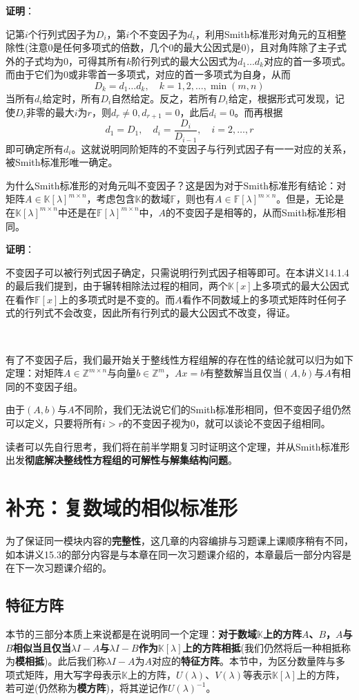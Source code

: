 \documentclass[a4paper,UTF8,fontset=windows,AutoFakeBold]{ctexart}
\newcommand*{\note}{\noindent *}
\newcommand{\proo}[1]{{\vspace{5pt}\kaishu\noindent\textbf{证明}：\vspace{-3pt}
\begin{compactitem}
    \item[] #1
\end{compactitem}
}}
\begin{document}
\proo{
    记第$i$个行列式因子为$D_i$，第$i$个不变因子为$d_i$，利用Smith标准形对角元的互相整除性(注意0是任何多项式的倍数，几个0的最大公因式是0)，且对角阵除了主子式外的子式均为0，可得其所有$k$阶行列式的最大公因式为$d_1\dots d_k$对应的首一多项式。而由于它们为0或非零首一多项式，对应的首一多项式为自身，从而
    $$D_k=d_1\dots d_k,\quad k=1,2,\dots,\min(m,n)$$
    当所有$d_i$给定时，所有$D_i$自然给定。反之，若所有$D_i$给定，根据形式可发现，记使$D_i$非零的最大$i$为$r$，则$d_r\ne 0,d_{r+1}=0$，此后$d_i=0$。而再根据
    $$d_1=D_1,\quad d_i=\frac{D_i}{D_{i-1}},\quad i=2,\dots,r$$
    即可确定所有$d_i$。这就说明同阶矩阵的不变因子与行列式因子有一一对应的关系，被Smith标准形唯一确定。
}

\note 为什么Smith标准形的对角元叫不变因子？这是因为对于Smith标准形有结论：对矩阵$A\in\mathbb{K}[\lambda]^{m\times n}$，考虑包含$\mathbb{K}$的数域$\mathbb{F}$，则也有$A\in\mathbb{F}[\lambda]^{m\times n}$。但是，无论是在$\mathbb{K}[\lambda]^{m\times n}$中还是在$\mathbb{F}[\lambda]^{m\times n}$中，$A$的不变因子是相等的，从而Smith标准形相同。

\proo{
    不变因子可以被行列式因子确定，只需说明行列式因子相等即可。在本讲义14.1.4的最后我们提到，由于辗转相除法过程的相同，两个$\mathbb{K}[x]$上多项式的最大公因式在看作$\mathbb{F}[x]$上的多项式时是不变的。而$A$看作不同数域上的多项式矩阵时任何子式的行列式不会改变，因此所有行列式的最大公因式不改变，得证。
}

\

有了不变因子后，我们最开始关于整线性方程组解的存在性的结论就可以归为如下定理：对矩阵$A\in\mathbb{Z}^{m\times n}$与向量$b\in\mathbb{Z}^m$，$Ax=b$有整数解当且仅当$(A,b)$与$A$有相同的不变因子组。

\note 由于$(A,b)$与$A$不同阶，我们无法说它们的Smith标准形相同，但不变因子组仍然可以定义，只要将所有$i>r$的不变因子视为0，就可以谈论不变因子组相同。

读者可以先自行思考，我们将在前半学期复习时证明这个定理，并从Smith标准形出发\textbf{彻底解决整线性方程组的可解性与解集结构问题}。

\section{补充：复数域的相似标准形}
\note 为了保证同一模块内容的\textbf{完整性}，这几章的内容编排与习题课上课顺序稍有不同，如本讲义15.3的部分内容是与本章在同一次习题课介绍的，本章最后一部分内容是在下一次习题课介绍的。

\subsection{特征方阵}
本节的三部分本质上来说都是在说明同一个定理：\textbf{对于数域$\mathbb{K}$上的方阵$A$、$B$，$A$与$B$相似当且仅当$\lambda I-A$与$\lambda I-B$作为$\mathbb{K}[\lambda]$上的方阵相抵}(我们仍然将后一种相抵称为\textbf{模相抵})。此后我们称$\lambda I-A$为$A$对应的\textbf{特征方阵}。本节中，为区分数量阵与多项式矩阵，用大写字母表示$\mathbb{K}$上的方阵，$U(\lambda)$、$V(\lambda)$等表示$\mathbb{K}[\lambda]$上的方阵，若可逆(仍然称为\textbf{模方阵})，将其逆记作$U(\lambda)^{-1}$。
\end{document}
